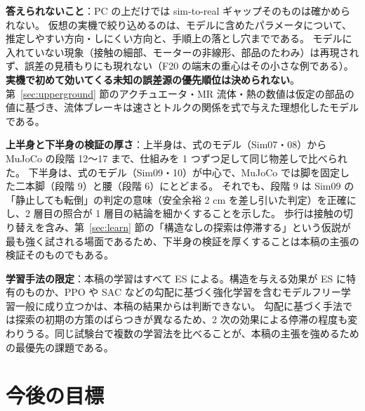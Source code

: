 \documentclass[paper=a4paper,fontsize=10pt,twocolumn,column_gap=2zw,line_length=24zw,number_of_lines=46,head_space=20mm]{jlreq}
\begin{document}
\textbf{答えられないこと}：PC の上だけでは sim-to-real ギャップそのものは確かめられない。
仮想の実機で絞り込めるのは、モデルに含めたパラメータについて、推定しやすい方向・しにくい方向と、手順上の落とし穴までである。
モデルに入れていない現象（接触の細部、モーターの非線形、部品のたわみ）は再現されず、誤差の見積もりにも現れない（F20 の端末の重心はその小さな例である）。\textbf{実機で初めて効いてくる未知の誤差源の優先順位は決められない}。
第~\ref{sec:upperground} 節のアクチュエータ・MR 流体・熱の数値は仮定の部品の値に基づき、流体ブレーキは速さとトルクの関係を式で与えた理想化したモデルである。

\textbf{上半身と下半身の検証の厚さ}：上半身は、式のモデル（Sim07・08）から MuJoCo の段階 12〜17 まで、仕組みを 1 つずつ足して同じ物差しで比べられた。
下半身は、式のモデル（Sim09・10）が中心で、MuJoCo では脚を固定した二本脚（段階 9）と腰（段階 6）にとどまる。
それでも、段階 9 は Sim09 の「静止しても転倒」の判定の意味（安全余裕 2 cm を差し引いた判定）を正確にし、2 層目の照合が 1 層目の結論を細かくすることを示した。
歩行は接触の切り替えを含み、第~\ref{sec:learn} 節の「構造なしの探索は停滞する」という仮説が最も強く試される場面であるため、下半身の検証を厚くすることは本稿の主張の検証そのものでもある。

\textbf{学習手法の限定}：本稿の学習はすべて ES による。構造を与える効果が ES に特有のものか、PPO や SAC などの勾配に基づく強化学習を含むモデルフリー学習一般に成り立つかは、本稿の結果からは判断できない。
勾配に基づく手法では探索の初期の方策のばらつきが異なるため、2 次の効果による停滞の程度も変わりうる。同じ試験台で複数の学習法を比べることが、本稿の主張を強めるための最優先の課題である。


\section{今後の目標}
\end{document}

